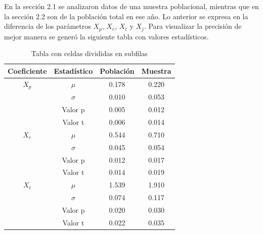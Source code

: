 \documentclass[12pt]{article} %
\begin{document}
En la sección 2.1 se analizaron datos de una muestra poblacional, mientras que en la sección 2.2 son de la población total en ese año.
Lo anterior se expresa en la diferencia de los parámetros $X_p$, $X_e$, $X_t$ y $X_j$. Para visualizar la precisión de mejor manera se generó la
siguiente tabla con valores estadísticos.\\

\begin{table}[H]
    \caption{Tabla con celdas divididas en subfilas}
    \centering
    \begin{tabular}{|c|c|c|c|}
    \hline
    \textbf{Coeficiente} & \textbf{Estadístico} & \textbf{Población} & \textbf{Muestra} \\ \hline
    $X_p$ & \multicolumn{1}{|c|}{\(\mu\)} & \multicolumn{1}{|c|}{0.178} & \multicolumn{1}{|c|}{0.220} \\ \cline{2-4}
    & \multicolumn{1}{|c|}{\(\sigma\)} & \multicolumn{1}{|c|}{0.010} & \multicolumn{1}{|c|}{0.053} \\ \cline{2-4}
    & \multicolumn{1}{|c|}{Valor p} & \multicolumn{1}{|c|}{0.005} & \multicolumn{1}{|c|}{0.012} \\ \cline{2-4}
    & \multicolumn{1}{|c|}{Valor t} & \multicolumn{1}{|c|}{0.006} & \multicolumn{1}{|c|}{0.014} \\ \hline
    
    $X_e$ & \multicolumn{1}{|c|}{\(\mu\)} & \multicolumn{1}{|c|}{0.544} & \multicolumn{1}{|c|}{0.710} \\ \cline{2-4}
    & \multicolumn{1}{|c|}{\(\sigma\)} & \multicolumn{1}{|c|}{0.045} & \multicolumn{1}{|c|}{0.054} \\ \cline{2-4}
    & \multicolumn{1}{|c|}{Valor p} & \multicolumn{1}{|c|}{0.012} & \multicolumn{1}{|c|}{0.017} \\ \cline{2-4}
    & \multicolumn{1}{|c|}{Valor t} & \multicolumn{1}{|c|}{0.014} & \multicolumn{1}{|c|}{0.019} \\ \hline
    
    $X_t$ & \multicolumn{1}{|c|}{\(\mu\)} & \multicolumn{1}{|c|}{1.539} & \multicolumn{1}{|c|}{1.910} \\ \cline{2-4}
    & \multicolumn{1}{|c|}{\(\sigma\)} & \multicolumn{1}{|c|}{0.074} & \multicolumn{1}{|c|}{0.117} \\ \cline{2-4}
    & \multicolumn{1}{|c|}{Valor p} & \multicolumn{1}{|c|}{0.020} & \multicolumn{1}{|c|}{0.030} \\ \cline{2-4}
    & \multicolumn{1}{|c|}{Valor t} & \multicolumn{1}{|c|}{0.022} & \multicolumn{1}{|c|}{0.035} \\ \hline
    

\end{tabular}
\end{table}
\end{document}
